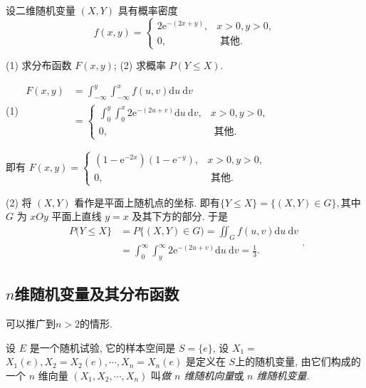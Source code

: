   \begin{example}
    设二维随机变量 $(X, Y)$ 具有概率密度
    $$
        f(x, y)= \begin{cases}2 \mathrm{e}^{-(2 x+y)}, & x>0, y>0, \\ 0, & \text { 其他. }\end{cases}
    $$

    (1) 求分布函数 $F(x, y)$; (2) 求概率 $P(Y \leq X)$.
  \end{example}
  \begin{solution}
    (1) $\begin{aligned} F(x, y) & =\int_{-\infty}^y \int_{-\infty}^x f(u, v) \mathrm{d} u \mathrm{~d} v \\ & = \begin{cases}\int_0^y \int_0^x 2 \mathrm{e}^{-(2 u+v)} \mathrm{d} u \mathrm{~d} v, & x>0, y>0, \\ 0, & \text { 其他. }\end{cases} \end{aligned}$

            即有 $F(x, y)= \begin{cases}\left(1-\mathrm{e}^{-2 x}\right)\left(1-\mathrm{e}^{-y}\right), & x>0, y>0, \\ 0, & \text { 其他. }\end{cases}$

            (2) 将 $(X, Y)$ 看作是平面上随机点的坐标. 即有$\{Y \leq X\}=\{(X, Y) \in G\},$其中 $G$ 为 $x O y$ 平面上直线 $y=x$ 及其下方的部分. 于是
                    $$\begin{aligned} P(Y \leq X\} & =P\{(X, Y) \in G)=\iint_G f(u, v) \mathrm{d} u \mathrm{~d} v \\ & =\int_0^{\infty} \int_y^{\infty} 2 \mathrm{e}^{-(2 u+v)} \mathrm{d} u \mathrm{~d} v=\frac{1}{3} . \quad \end{aligned}.$$
  \end{solution}
  \subsection{$n$维随机变量及其分布函数}
  可以推广到$n>2$的情形.
    \begin{definition}
        设 $E$ 是一个随机试验, 它的样本空间是 $S=\{e\}$, 设 $X_1=$ $X_1(e), X_2=X_2(e), \cdots, X_n=X_n(e)$ 是定义在 $S$上的随机变量, 由它们构成的一个 $n$ 维向量 $\left(X_1, X_2, \cdots, X_n\right)$ 叫\emph{做 $n$ 维随机向量}或 \emph{$n$ 维随机变量}.
    \end{definition}


